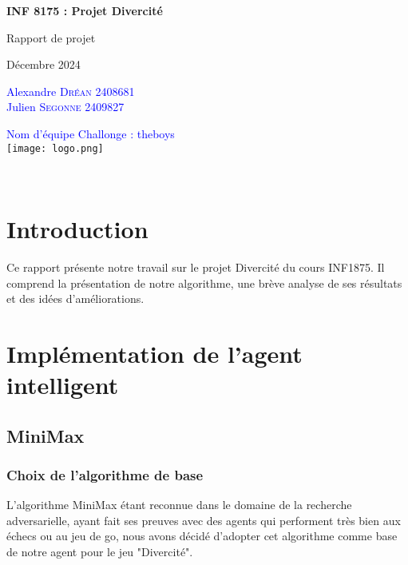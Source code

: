\documentclass[a4paper,11pt,titlepage,leqno]{article}
\newcommand{\Course}{INF 8175 : Projet Divercité}
\newcommand{\Title}{Rapport de projet}
\newcommand{\Authors}{Alexandre \textsc{Dréan} 2408681 \\ Julien \textsc{Segonne} 2409827}
\newcommand{\Date}{\large Décembre 2024}
\begin{document}
\begin{titlepage}
\vspace*{\fill}
\centering
{\Large\bfseries\textcolor{deepblue}{\Course}\par}
\vspace{0.2in}
{\huge\textcolor{deepblue}{\Title} \par}
\vspace{0.2in}
{\textcolor{deepblue}{\Date} \par}
\vspace{0.5in}
{\Large\textcolor{blue}{\Authors}\par}
\vspace{0.2in}
\textcolor{blue}{\large Nom d'équipe Challonge : theboys}\\
\vspace{0.9in}
\texttt{[image: logo.png]}
\vspace*{\fill}
\end{titlepage}

\setcounter{page}{2}
\tableofcontents
~
\newpage

\section*{Introduction}

Ce rapport présente notre travail sur le projet Divercité du cours INF1875. Il comprend la présentation de notre algorithme, une brève analyse de ses résultats et des idées d'améliorations.

\section{Implémentation de l'agent intelligent}
\subsection{MiniMax}

\subsubsection{Choix de l'algorithme de base}
L'algorithme MiniMax étant reconnue dans le domaine de la recherche adversarielle, ayant fait ses preuves avec des agents qui performent très bien aux échecs ou au jeu de go, nous avons décidé d'adopter cet algorithme comme base de notre agent pour le jeu "Divercité".\\
\end{document}
